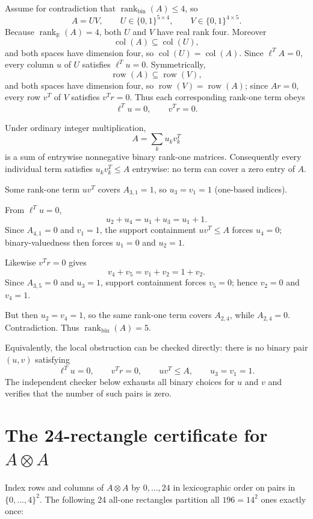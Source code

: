 \documentclass[11pt]{article}
\newcommand{\rankbin}{\operatorname{rank}_{\mathrm{bin}}}
\newcommand{\rankR}{\operatorname{rank}_{\mathbb{R}}}
\begin{document}
Assume for contradiction that $\rankbin(A)\le4$, so
\[
A=UV,
\qquad
U\in\{0,1\}^{5\times4},
\qquad
V\in\{0,1\}^{4\times5}.
\]
Because $\rankR(A)=4$, both $U$ and $V$ have real rank four. Moreover
\[
\operatorname{col}(A)\subseteq\operatorname{col}(U),
\]
and both spaces have dimension four, so $\operatorname{col}(U)=\operatorname{col}(A)$. Since $\ell^T A=0$, every column $u$ of $U$ satisfies $\ell^T u=0$. Symmetrically,
\[
\operatorname{row}(A)\subseteq\operatorname{row}(V),
\]
and both spaces have dimension four, so $\operatorname{row}(V)=\operatorname{row}(A)$; since $Ar=0$, every row $v^T$ of $V$ satisfies $v^T r=0$. Thus each corresponding rank-one term obeys
\begin{equation}
\ell^T u=0,
\qquad
v^T r=0.
\tag{1}
\end{equation}

Under ordinary integer multiplication,
\[
A=\sum_k u_kv_k^T
\]
is a sum of entrywise nonnegative binary rank-one matrices. Consequently every individual term satisfies $u_kv_k^T\le A$ entrywise: no term can cover a zero entry of $A$.

Some rank-one term $uv^T$ covers $A_{3,1}=1$, so $u_3=v_1=1$ (one-based indices).

From $\ell^T u=0$,
\[
u_2+u_4=u_1+u_3=u_1+1.
\]
Since $A_{4,1}=0$ and $v_1=1$, the support containment $uv^T\le A$ forces $u_4=0$; binary-valuedness then forces $u_1=0$ and $u_2=1$.

Likewise $v^T r=0$ gives
\[
v_4+v_5=v_1+v_2=1+v_2.
\]
Since $A_{3,5}=0$ and $u_3=1$, support containment forces $v_5=0$; hence $v_2=0$ and $v_4=1$.

But then $u_2=v_4=1$, so the same rank-one term covers $A_{2,4}$, while $A_{2,4}=0$. Contradiction. Thus $\rankbin(A)=5$.

Equivalently, the local obstruction can be checked directly: there is no binary pair $(u,v)$ satisfying
\[
\ell^T u=0,
\qquad
v^T r=0,
\qquad
uv^T\le A,
\qquad
u_3=v_1=1.
\]
The independent checker below exhausts all binary choices for $u$ and $v$ and verifies that the number of such pairs is zero.

\section*{The 24-rectangle certificate for $A\otimes A$}

Index rows and columns of $A\otimes A$ by $0,\ldots,24$ in lexicographic order on pairs in $\{0,\ldots,4\}^2$. The following 24 all-one rectangles partition all $196=14^2$ ones exactly once:
\end{document}
